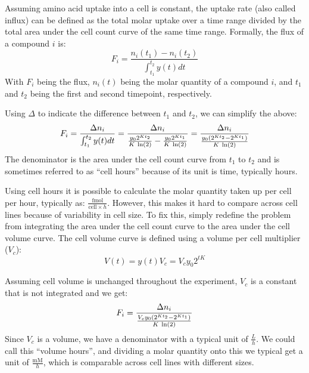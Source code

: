 Assuming amino acid uptake into a cell is constant, the uptake rate (also called influx) can be defined as the total molar uptake over a time range divided by the total area under the cell count curve of the same time range.
Formally, the flux of a compound $i$ is:
\begin{equation}
    F_i = \frac{n_i(t_1) - n_i(t_2)}{\int_{t_1}^{t_2} y(t) dt}
\end{equation}
With $F_i$ being the flux, $n_i(t)$ being the molar quantity of a compound $i$, and $t_1$ and $t_2$ being the first and second timepoint, respectively.

Using $\Delta$ to indicate the difference between $t_1$ and $t_2$, we can simplify the above:
\begin{equation}
    F_i = \frac{\Delta n_i}{\int_{t_1}^{t_2} y(t) dt} = \frac{\Delta n_i}{\frac{y_0 2^{K t_2}}{K\ \natlog(2)} - \frac{y_0 2^{K t_1}}{K\ \natlog(2)}} = \frac{\Delta n_i}{\frac{y_0 (2^{K t_2} - 2^{K t_1})}{K\ \natlog(2)}}
\end{equation}
The denominator is the area under the cell count curve from $t_1$ to $t_2$ and is sometimes referred to as ``cell hours'' because of its unit is time, typically hours.

Using cell hours it is possible to calculate the molar quantity taken up per cell per hour, typically as: $\frac{\text{fmol}}{\text{cell}\times h}$.
However, this makes it hard to compare across cell lines because of variability in cell size.
To fix this, simply redefine the problem from integrating the area under the cell count curve to the area under the cell volume curve.
The cell volume curve is defined using a volume per cell multiplier ($V_c$):
\begin{equation}
    V(t) = y(t) V_c = V_c y_0 2^{t K}
\end{equation}

Assuming cell volume is unchanged throughout the experiment, $V_c$ is a constant that is not integrated and we get:
\begin{equation}
    F_i = \frac{\Delta n_i}{\frac{V_c y_0 (2^{K t_2} - 2^{K t_1})}{K\ \text{ln}(2)}}
\label{eq:ch2:fl_vh}
\end{equation}
Since $V_c$ is a volume, we have a denominator with a typical unit of $\frac{L}{h}$.
We could call this ``volume hours'', and dividing a molar quantity onto this we typical get a unit of $\frac{\text{mM}}{h}$, which is comparable across cell lines with different sizes.

